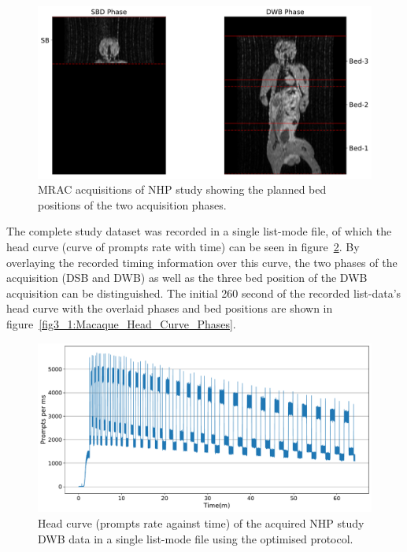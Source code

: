 \begin{figure} [ht!]
\centering
\includegraphics[scale=0.5,angle=0]{3_Results/3_1_DWB_Optimization/figures/3_1_Macaque_MRI.pdf}
\caption{MRAC acquisitions of NHP study showing the planned bed positions of the two acquisition phases.}
\label{fig3_1:Macaque_MRI}
\end{figure}

The complete study dataset was recorded in a single list-mode file, of which the head curve (curve of prompts rate with time) can be seen in figure~\ref{fig3_1:Macaque_Head_Curve}. By overlaying the recorded timing information over this curve, the two phases of the acquisition (DSB and DWB) as well as the three bed position of the DWB acquisition can be distinguished. The initial 260 second of the recorded list-data's head curve with the overlaid phases and bed positions are shown in figure~\ref{fig3_1:Macaque_Head_Curve_Phases}. 

\begin{figure} [ht!]
\centering
\includegraphics[scale=0.45,angle=0]{3_Results/3_1_DWB_Optimization/figures/3_1_Macaque_Head_Curve.pdf}
\caption{Head curve (prompts rate against time) of the acquired NHP study DWB data in a single list-mode file using the optimised protocol.}
\label{fig3_1:Macaque_Head_Curve}
\end{figure}

